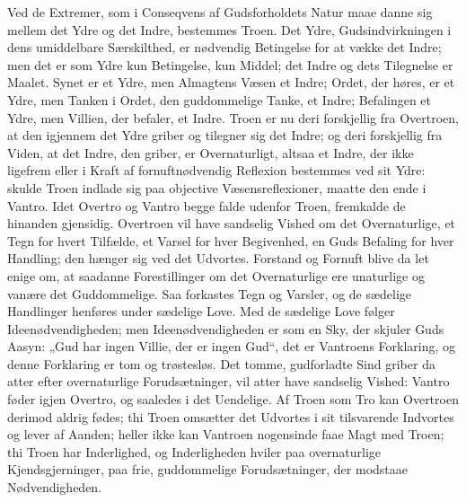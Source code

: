 \documentclass[12pt]{book}
\begin{document}
Ved de Extremer, som i Conseqvens af Gudsforholdets Natur maae danne
sig mellem det Ydre og det Indre, bestemmes Troen. Det Ydre,
Gudsindvirkningen i dens umiddelbare Særskilthed, er nødvendig
Betingelse for at vække det Indre; men det er som Ydre kun
Betingelse, kun Middel; det Indre og dets Tilegnelse er Maalet.
Synet er et Ydre, men Almagtens Væsen et Indre; Ordet, der høres, er
et Ydre, men Tanken i Ordet, den guddommelige Tanke, et Indre;
Befalingen et Ydre, men Villien, der befaler, et Indre. Troen er nu
deri forskjellig fra Overtroen, at den igjennem det Ydre griber og
tilegner sig det Indre; og deri forskjellig fra Viden, at det Indre,
den griber, er Overnaturligt, altsaa et Indre, der ikke ligefrem
eller i Kraft af fornuftnødvendig Reflexion bestemmes ved sit Ydre:
skulde Troen indlade sig paa objective Væsensreflexioner, maatte den
ende i Vantro.
Idet Overtro og Vantro begge falde udenfor Troen, fremkalde de
hinanden gjensidig. Overtroen vil have sandselig Vished om det
Overnaturlige, et Tegn for hvert Tilfælde, et Varsel for hver
Begivenhed, en Guds Befaling for hver Handling; den hænger sig ved
det Udvortes. Forstand og Fornuft blive da let enige om, at saadanne
Forestillinger om det Overnaturlige ere unaturlige og vanære det
Guddommelige. Saa forkastes Tegn og Varsler, og de sædelige
Handlinger henføres under sædelige Love. Med de sædelige Love følger
Ideenødvendigheden; men Ideenødvendigheden er som en Sky, der
skjuler Guds Aasyn: „Gud har ingen Villie, der er ingen Gud“, det er
Vantroens Forklaring, og denne Forklaring er tom og trøstesløs. Det
tomme, gudforladte Sind griber da atter efter overnaturlige
Forudsætninger, vil atter have sandselig Vished: Vantro føder igjen
Overtro, og saaledes i det Uendelige. Af Troen som Tro kan Overtroen
derimod aldrig fødes; thi Troen omsætter det Udvortes i sit
tilsvarende Indvortes og lever af Aanden; heller ikke kan Vantroen
nogensinde faae Magt med Troen; thi Troen har Inderlighed, og
Inderligheden hviler paa overnaturlige Kjendsgjerninger, paa frie,
guddommelige Forudsætninger, der modstaae Nødvendigheden.
\end{document}
